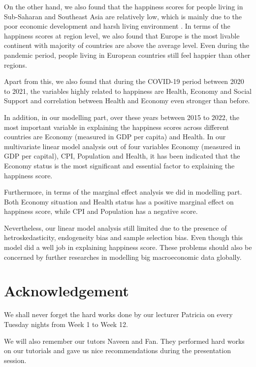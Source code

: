 \documentclass[11pt,a4paper,]{article}
\begin{document}
On the other hand, we also found that the happiness scores for people living in Sub-Saharan and Southeast Asia are relatively low, which is mainly due to the poor economic development and harsh living environment \autocite{helliwell2021world}. In terms of the happiness scores at region level, we also found that Europe is the most livable continent with majority of countries are above the average level. Even during the pandemic period, people living in European countries still feel happier than other regions.

Apart from this, we also found that during the COVID-19 period between 2020 to 2021, the variables highly related to happiness are Health, Economy and Social Support and correlation between Health and Economy even stronger than before.

In addition, in our modelling part, over these years between 2015 to 2022, the most important variable in explaining the happiness scores across different countries are Economy (measured in GDP per capita) and Health. In our multivariate linear model analysis out of four variables Economy (measured in GDP per capital), CPI, Population and Health, it has been indicated that the Economy status is the most significant and essential factor to explaining the happiness score.

Furthermore, in terms of the marginal effect analysis we did in modelling part. Both Economy situation and Health status has a positive marginal effect on happiness score, while CPI and Population has a negative score.

Nevertheless, our linear model analysis still limited due to the presence of hetroskedasticity, endogeneity bias and sample selection bias. Even though this model did a well job in explaining happiness score. These problems should also be concerned by further researches in modelling big macroeconomic data globally.

\hypertarget{acknowledgement}{%
\section{Acknowledgement}\label{acknowledgement}}

We shall never forget the hard works done by our lecturer Patricia on every Tuesday nights from Week 1 to Week 12.

We will also remember our tutors Naveen and Fan. They performed hard works on our tutorials and gave us nice recommendations during the presentation session.
\end{document}
